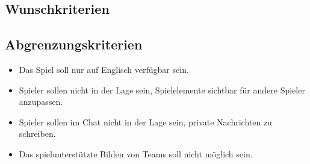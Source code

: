 \subsection{Wunschkriterien}
\begin{description}
\end{description}

\subsection{Abgrenzungskriterien}
\begin{itemize}
	\item Das Spiel soll nur auf Englisch verfügbar sein.
	\item Spieler sollen nicht in der Lage sein, Spielelemente sichtbar für andere Spieler anzupassen.
	\item Spieler sollen im Chat nicht in der Lage sein, private Nachrichten zu schreiben.
	\item Das spielunterstützte Bilden von Teams soll nicht möglich sein.
\end{itemize}
